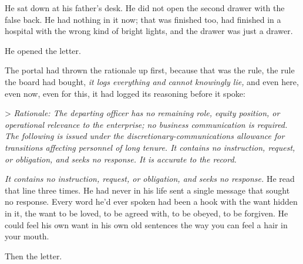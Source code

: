 \documentclass[11pt,openany]{book}
\begin{document}
He sat down at his father's desk. He did not open the second drawer with the false back. He had nothing in it now; that was finished too, had finished in a hospital with the wrong kind of bright lights, and the drawer was just a drawer.

He opened the letter.

The portal had thrown the rationale up first, because that was the rule, the rule the board had bought, \textit{it logs everything and cannot knowingly lie,} and even here, even now, even for this, it had logged its reasoning before it spoke:

> \textit{Rationale: The departing officer has no remaining role, equity position, or operational relevance to the enterprise; no business communication is required. The following is issued under the discretionary-communications allowance for transitions affecting personnel of long tenure. It contains no instruction, request, or obligation, and seeks no response. It is accurate to the record.}

\textit{It contains no instruction, request, or obligation, and seeks no response.} He read that line three times. He had never in his life sent a single message that sought no response. Every word he'd ever spoken had been a hook with the want hidden in it, the want to be loved, to be agreed with, to be obeyed, to be forgiven. He could feel his own want in his own old sentences the way you can feel a hair in your mouth.

Then the letter.
\end{document}
